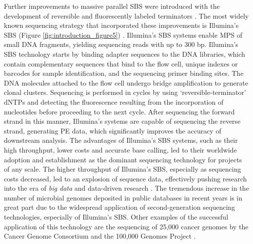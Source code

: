 Further improvements to massive parallel \ac{SBS} were introduced with the development of reversible and fluorescently labeled terminators \cite{turcatti_new_2008}. The most widely known sequencing strategy that incorporated these improvements is Illumina’s \ac{SBS} (Figure \ref{fig:introduction_figure5}) \cite{uhlen_sequential_2023, bentley_accurate_2008, fedurco_bta_2006}. Illumina’s \ac{SBS} systems enable \ac{MPS} of small \ac{DNA} fragments, yielding sequencing reads with up to 300 bp. Illumina’s \ac{SBS} technology starts by binding adapter sequences to the \ac{DNA} libraries, which contain complementary sequences that bind to the flow cell, unique indexes or barcodes for sample identification, and the sequencing primer binding sites. The \ac{DNA} molecules attached to the flow cell undergo bridge amplification to generate clonal clusters. Sequencing is performed in cycles by using ‘reversible-terminator’ \ac{dNTPs} and detecting the fluorescence resulting from the incorporation of nucleotides before proceeding to the next cycle. After sequencing the forward strand in this manner, Illumina’s systems are capable of sequencing the reverse strand, generating \ac{PE} data, which significantly improves the accuracy of downstream analysis. The advantages of Illumina’s \ac{SBS} systems, such as their high throughput, lower costs and accurate base calling, led to their worldwide adoption and establishment as the dominant sequencing technology for projects of any scale. The higher throughput of Illumina’s \ac{SBS}, especially as sequencing costs decreased, led to an explosion of sequence data, effectively pushing research into the era of \textit{big data} and data-driven research \cite{uhlen_sequential_2023}. The tremendous increase in the number of microbial genomes deposited in public databases in recent years is in great part due to the widespread application of second-generation sequencing technologies, especially of Illumina’s \ac{SBS}. Other examples of the successful application of this technology are the sequencing of 25,000 cancer genomes by the Cancer Genome Consortium \cite{zhang_international_2019} and the 100,000 Genomes Project \cite{the_100000_genomes_project_pilot_investigators_100000_2021}.

